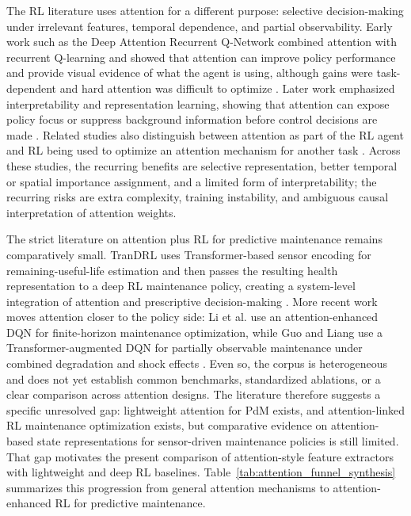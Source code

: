 \documentclass[sn-basic]{sn-jnl}%
\begin{document}
The RL literature uses attention for a different purpose: selective decision-making under irrelevant features, temporal dependence, and partial observability. Early work such as the Deep Attention Recurrent Q-Network combined attention with recurrent Q-learning and showed that attention can improve policy performance and provide visual evidence of what the agent is using, although gains were task-dependent and hard attention was difficult to optimize \cite{Sorokin2015}. Later work emphasized interpretability and representation learning, showing that attention can expose policy focus or suppress background information before control decisions are made \cite{Mott2019, Wu2021}. Related studies also distinguish between attention as part of the RL agent and RL being used to optimize an attention mechanism for another task \cite{BlakemanMareschal2022, Fei2021}. Across these studies, the recurring benefits are selective representation, better temporal or spatial importance assignment, and a limited form of interpretability; the recurring risks are extra complexity, training instability, and ambiguous causal interpretation of attention weights.

The strict literature on attention plus RL for predictive maintenance remains comparatively small. TranDRL uses Transformer-based sensor encoding for remaining-useful-life estimation and then passes the resulting health representation to a deep RL maintenance policy, creating a system-level integration of attention and prescriptive decision-making \cite{Zhao2024}. More recent work moves attention closer to the policy side: Li et al. use an attention-enhanced DQN for finite-horizon maintenance optimization, while Guo and Liang use a Transformer-augmented DQN for partially observable maintenance under combined degradation and shock effects \cite{Li2025, Guo2026}. Even so, the corpus is heterogeneous and does not yet establish common benchmarks, standardized ablations, or a clear comparison across attention designs. The literature therefore suggests a specific unresolved gap: lightweight attention for PdM exists, and attention-linked RL maintenance optimization exists, but comparative evidence on attention-based state representations for sensor-driven maintenance policies is still limited. That gap motivates the present comparison of attention-style feature extractors with lightweight and deep RL baselines. Table~\ref{tab:attention_funnel_synthesis} summarizes this progression from general attention mechanisms to attention-enhanced RL for predictive maintenance.
\end{document}
